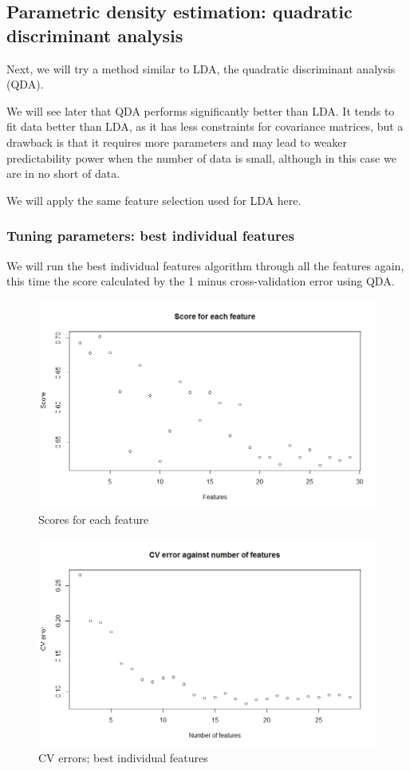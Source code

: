 \documentclass[11pt, a4paper]{article}
\begin{document}
\subsection{Parametric density estimation: quadratic discriminant analysis}

Next, we will try a method similar to LDA, the quadratic discriminant analysis (QDA).

We will see later that QDA performs significantly better than LDA. It tends to fit data better than LDA, as it has less constraints for covariance matrices, but a drawback is that it requires more parameters and may lead to weaker predictability power when the number of data is small, although in this case we are in no short of data. 

We will apply the same feature selection used for LDA here.

\subsubsection{Tuning parameters: best individual features}

We will run the best individual features algorithm through all the features again, this time the score calculated by the 1 minus cross-validation error using QDA.

\begin{figure}[H]
\centering
	\includegraphics[scale=0.4]{qdacv1.jpeg}
\caption{Scores for each feature}
\end{figure}

\begin{figure}[H]
\centering
	\includegraphics[scale=0.4]{qdacv2.jpeg}
\caption{CV errors; best individual features}
\end{figure}
\end{document}

